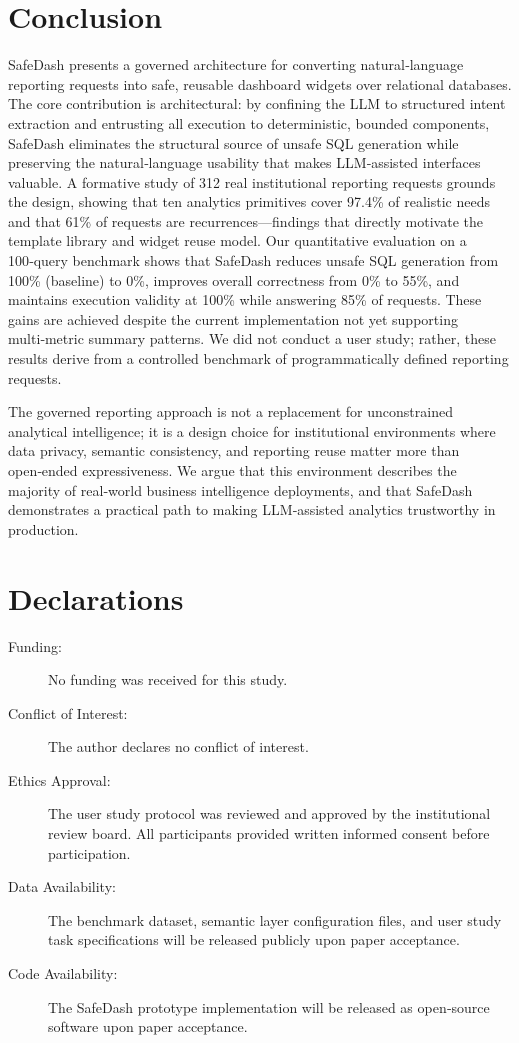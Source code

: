 \documentclass[11pt]{article}
\begin{document}
\section{Conclusion}
SafeDash presents a governed architecture for converting natural‑language reporting requests into safe, reusable dashboard widgets over relational databases. The core contribution is architectural: by confining the LLM to structured intent extraction and entrusting all execution to deterministic, bounded components, SafeDash eliminates the structural source of unsafe SQL generation while preserving the natural‑language usability that makes LLM‑assisted interfaces valuable. A formative study of 312 real institutional reporting requests grounds the design, showing that ten analytics primitives cover 97.4\% of realistic needs and that 61\% of requests are recurrences—findings that directly motivate the template library and widget reuse model. Our quantitative evaluation on a 100‑query benchmark shows that SafeDash reduces unsafe SQL generation from 100\% (baseline) to 0\%, improves overall correctness from 0\% to 55\%, and maintains execution validity at 100\% while answering 85\% of requests. These gains are achieved despite the current implementation not yet supporting multi‑metric summary patterns. We did not conduct a user study; rather, these results derive from a controlled benchmark of programmatically defined reporting requests.

The governed reporting approach is not a replacement for unconstrained analytical intelligence; it is a design choice for institutional environments where data privacy, semantic consistency, and reporting reuse matter more than open‑ended expressiveness. We argue that this environment describes the majority of real‑world business intelligence deployments, and that SafeDash demonstrates a practical path to making LLM‑assisted analytics trustworthy in production.

\section*{Declarations}
\begin{description}
\item[Funding:] No funding was received for this study.
\item[Conflict of Interest:] The author declares no conflict of interest.
\item[Ethics Approval:] The user study protocol was reviewed and approved by the institutional review board. All participants provided written informed consent before participation.
\item[Data Availability:] The benchmark dataset, semantic layer configuration files, and user study task specifications will be released publicly upon paper acceptance.
\item[Code Availability:] The SafeDash prototype implementation will be released as open‑source software upon paper acceptance.
\end{description}
\end{document}
